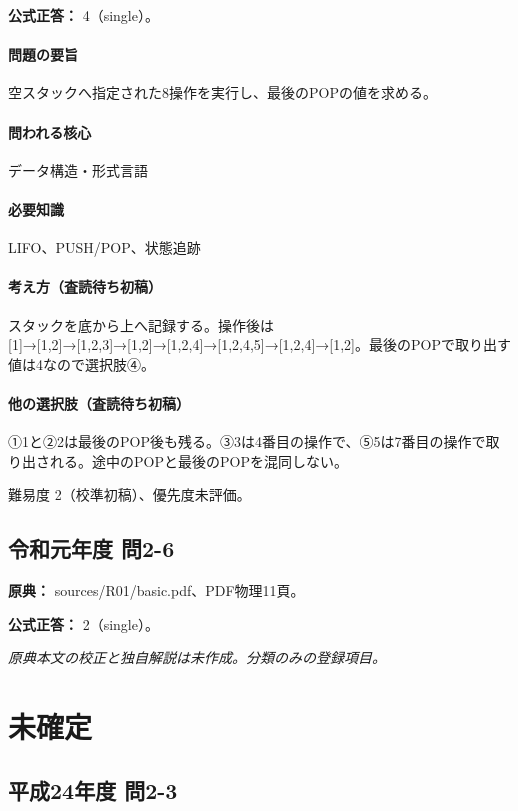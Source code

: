 \textbf{公式正答：} 4（single）。

\paragraph{問題の要旨} 空スタックへ指定された8操作を実行し、最後のPOPの値を求める。

\paragraph{問われる核心} データ構造・形式言語

\paragraph{必要知識} LIFO、PUSH/POP、状態追跡

\paragraph{考え方（査読待ち初稿）} スタックを底から上へ記録する。操作後は [1]→[1,2]→[1,2,3]→[1,2]→[1,2,4]→[1,2,4,5]→[1,2,4]→[1,2]。最後のPOPで取り出す値は4なので選択肢④。

\paragraph{他の選択肢（査読待ち初稿）} ①1と②2は最後のPOP後も残る。③3は4番目の操作で、⑤5は7番目の操作で取り出される。途中のPOPと最後のPOPを混同しない。

\par 難易度 2（校準初稿）、優先度未評価。

\subsection{令和元年度 問2-6}
\label{q:r01-reg-basic-2-6}

\noindent\textbf{原典：} sources/R01/basic.pdf、PDF物理11頁。

\textbf{公式正答：} 2（single）。

\par\textit{原典本文の校正と独自解説は未作成。分類のみの登録項目。}

\section{未確定}

\subsection{平成24年度 問2-3}
\label{q:h24-reg-basic-2-3}

